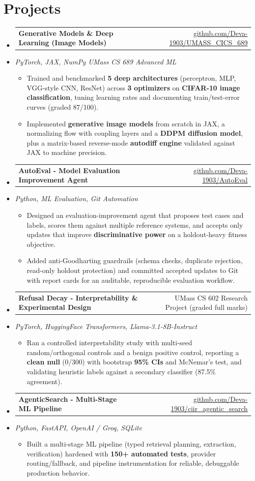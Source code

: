 \documentclass[letterpaper,10pt]{article}
\makeatletter
\newcommand{\resumeItem}[1]{
  \item\small{#1\vspace{-1pt}}
}
\newcommand{\resumeProjectHeading}[2]{
    \item
    \begin{tabular*}{0.985\textwidth}[t]{l@{\extracolsep{\fill}}r}
      \small\textbf{#1} & \small #2 \\
    \end{tabular*}\vspace{-5pt}
}
\newcommand{\resumeProjectSubheading}[1]{
  \vspace{-2pt}\item[] {\small\textcolor{ResumeSlate}{\emph{#1}}}\vspace{-3pt}
}
\newcommand{\resumeSubHeadingListStart}{\begin{itemize}[leftmargin=0.0in, label={}, itemsep=2pt, topsep=2pt]}
\newcommand{\resumeSubHeadingListEnd}{\end{itemize}}
\newcommand{\resumeItemListStart}{\begin{itemize}[leftmargin=0.18in, itemsep=2pt, topsep=1pt]}
\newcommand{\resumeItemListEnd}{\end{itemize}\vspace{-4pt}}
\makeatother
\begin{document}
\section{Projects}
\resumeSubHeadingListStart
  \resumeProjectHeading
    {Generative Models \& Deep Learning (Image Models)}
    {\href{https://github.com/Deva-1903/UMASS_CICS_689}{github.com/Deva-1903/UMASS\_CICS\_689}}
  \resumeProjectSubheading{PyTorch, JAX, NumPy \enspace\textbar\enspace UMass CS 689 Advanced ML}
    \resumeItemListStart
      \resumeItem{Trained and benchmarked \textbf{5 deep architectures} (perceptron, MLP, VGG-style CNN, ResNet) across \textbf{3 optimizers} on \textbf{CIFAR-10 image classification}, tuning learning rates and documenting train/test-error curves (graded 87/100).}
      \resumeItem{Implemented \textbf{generative image models} from scratch in JAX, a normalizing flow with coupling layers and a \textbf{DDPM diffusion model}, plus a matrix-based reverse-mode \textbf{autodiff engine} validated against JAX to machine precision.}
    \resumeItemListEnd
  \resumeProjectHeading
    {AutoEval - Model Evaluation Improvement Agent}
    {\href{https://github.com/Deva-1903/AutoEval}{github.com/Deva-1903/AutoEval}}
  \resumeProjectSubheading{Python, ML Evaluation, Git Automation}
    \resumeItemListStart
      \resumeItem{Designed an evaluation-improvement agent that proposes test cases and labels, scores them against multiple reference systems, and accepts only updates that improve \textbf{discriminative power} on a holdout-heavy fitness objective.}
      \resumeItem{Added anti-Goodharting guardrails (schema checks, duplicate rejection, read-only holdout protection) and committed accepted updates to Git with report cards for an auditable, reproducible evaluation workflow.}
    \resumeItemListEnd
  \resumeProjectHeading
    {Refusal Decay - Interpretability \& Experimental Design}
    {UMass CS 602 Research Project (graded full marks)}
  \resumeProjectSubheading{PyTorch, HuggingFace Transformers, Llama-3.1-8B-Instruct}
    \resumeItemListStart
      \resumeItem{Ran a controlled interpretability study with multi-seed random/orthogonal controls and a benign positive control, reporting a \textbf{clean null} (0/300) with bootstrap \textbf{95\% CIs} and McNemar's test, and validating heuristic labels against a secondary classifier (87.5\% agreement).}
    \resumeItemListEnd
  \resumeProjectHeading
    {AgenticSearch - Multi-Stage ML Pipeline}
    {\href{https://github.com/Deva-1903/ciir_agentic_search}{github.com/Deva-1903/ciir\_agentic\_search}}
  \resumeProjectSubheading{Python, FastAPI, OpenAI / Groq, SQLite}
    \resumeItemListStart
      \resumeItem{Built a multi-stage ML pipeline (typed retrieval planning, extraction, verification) hardened with \textbf{150+ automated tests}, provider routing/fallback, and pipeline instrumentation for reliable, debuggable production behavior.}
    \resumeItemListEnd
\resumeSubHeadingListEnd
\vspace{-4pt}
\end{document}
